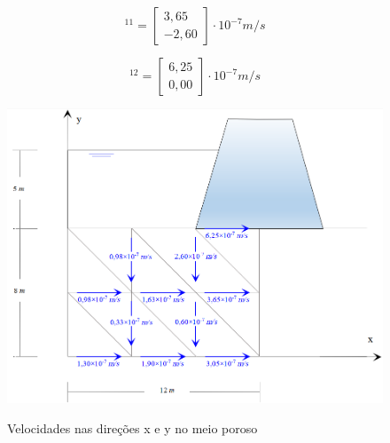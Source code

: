 \documentclass{article} %
\begin{document}
 \begin{equation}
[v]^{11}=\begin{bmatrix}
3,65\\
-2,60
\end{bmatrix}\cdot 10^{-7}m/s
\end{equation}

 \begin{equation}
[v]^{12}=\begin{bmatrix}
6,25\\
0,00
\end{bmatrix}\cdot 10^{-7}m/s
\end{equation}





\begin{figure}[H]
	\centering
	\caption{Velocidades nas direções x e y no meio poroso}
	\includegraphics[width=1\linewidth]{velocidade}	
	\label{velocidadefinal}	
\end{figure}




%
%
\end{document}
